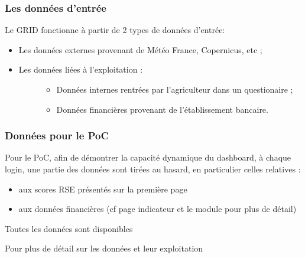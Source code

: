\documentclass[letterpaper,10pt,french]{sphinxmanual}
\begin{document}
\subsubsection{Les données d’entrée}
\label{\detokenize{intro:les-donnees-d-entree}}
\sphinxAtStartPar
Le GRID fonctionne à partir de 2 types de données d’entrée:
\begin{itemize}
\item {} 
\sphinxAtStartPar
Les données externes provenant de Météo France, Copernicus, etc ;

\item {} \begin{description}
\item[{Les données liées à l’exploitation :}] \leavevmode\begin{itemize}
\item {} 
\sphinxAtStartPar
Données internes rentrées par l’agriculteur dans un questionaire ;

\item {} 
\sphinxAtStartPar
Données financières provenant de l’établissement bancaire.

\end{itemize}

\end{description}

\end{itemize}


\subsubsection{Données pour le PoC}
\label{\detokenize{intro:donnees-pour-le-poc}}
\sphinxAtStartPar
Pour le PoC, afin de démontrer la capacité dynamique du dashboard, à chaque login, une partie des données sont tirées au hasard, en particulier celles relatives :
\begin{itemize}
\item {} 
\sphinxAtStartPar
aux scores RSE présentés sur la première page

\item {} 
\sphinxAtStartPar
aux données financières (cf page indicateur et le module  pour plus de détail)

\end{itemize}

\sphinxAtStartPar
Toutes les données sont disponibles 

\sphinxAtStartPar
Pour plus de détail sur les données et leur exploitation {\hyperref[\detokenize{indicateurs:indic}]{}}
\end{document}
